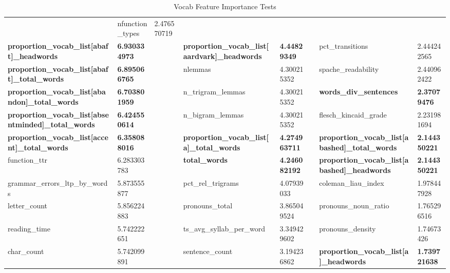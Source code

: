 \begin{table}[h]
{\begin{tabular}{@{}llllllll@{}}
  &
  nfunction\_types &
  2.476570719 \\
\cellcolor[HTML]{EFEFEF}\textbf{proportion\_vocab\_list{[}abaft{]}\_headwords} &
  \cellcolor[HTML]{EFEFEF}\textbf{6.930334973} &
  &
  \cellcolor[HTML]{EFEFEF}\textbf{proportion\_vocab\_list{[}aardvark{]}\_headwords} &
  \cellcolor[HTML]{EFEFEF}\textbf{4.44829349} &
  &
  pct\_transitions &
  2.444242565 \\
\cellcolor[HTML]{EFEFEF}\textbf{proportion\_vocab\_list{[}abaft{]}\_total\_words} &
  \cellcolor[HTML]{EFEFEF}\textbf{6.895066765} &
  &
  nlemmas &
  4.300215352 &
  &
  spache\_readability &
  2.440962422 \\
\cellcolor[HTML]{EFEFEF}\textbf{proportion\_vocab\_list{[}abandon{]}\_total\_words} &
  \cellcolor[HTML]{EFEFEF}\textbf{6.703801959} &
  &
  n\_trigram\_lemmas &
  4.300215352 &
  &
  \cellcolor[HTML]{EFEFEF}\textbf{words\_div\_sentences} &
  \cellcolor[HTML]{EFEFEF}\textbf{2.37079476} \\
\cellcolor[HTML]{EFEFEF}\textbf{proportion\_vocab\_list{[}absentminded{]}\_total\_words} &
  \cellcolor[HTML]{EFEFEF}\textbf{6.424550614} &
  &
  n\_bigram\_lemmas &
  4.300215352 &
  &
  flesch\_kincaid\_grade &
  2.231981694 \\
\cellcolor[HTML]{EFEFEF}\textbf{proportion\_vocab\_list{[}accent{]}\_total\_words} &
  \cellcolor[HTML]{EFEFEF}\textbf{6.358088016} &
  &
  \cellcolor[HTML]{EFEFEF}\textbf{proportion\_vocab\_list{[}a{]}\_total\_words} &
  \cellcolor[HTML]{EFEFEF}\textbf{4.274963711} &
  &
  \cellcolor[HTML]{EFEFEF}\textbf{proportion\_vocab\_list{[}abashed{]}\_total\_words} &
  \cellcolor[HTML]{EFEFEF}\textbf{2.144350221} \\
function\_ttr &
  6.283303783 &
  &
  \cellcolor[HTML]{EFEFEF}\textbf{total\_words} &
  \cellcolor[HTML]{EFEFEF}\textbf{4.246082192} &
  &
  \cellcolor[HTML]{EFEFEF}\textbf{proportion\_vocab\_list{[}abashed{]}\_headwords} &
  \cellcolor[HTML]{EFEFEF}\textbf{2.144350221} \\
grammar\_errors\_ltp\_by\_words &
  5.873555877 &
  &
  pct\_rel\_trigrams &
  4.07939033 &
  &
  coleman\_liau\_index &
  1.978447928 \\
letter\_count &
  5.856224883 &
  &
  pronouns\_total &
  3.865049524 &
  &
  pronouns\_noun\_ratio &
  1.765296516 \\
reading\_time &
  5.742222651 &
  &
  ts\_avg\_syllab\_per\_word &
  3.349429602 &
  &
  pronouns\_density &
  1.74673426 \\
char\_count &
  5.742099891 &
  &
  sentence\_count &
  3.194236862 &
  &
  \cellcolor[HTML]{EFEFEF}\textbf{proportion\_vocab\_list{[}a{]}\_headwords} &
  \cellcolor[HTML]{EFEFEF}\textbf{1.739721638} \\ \bottomrule
\end{tabular}%
}
\caption{Vocab Feature Importance Tests}
\label{tab:e1}
\end{table}

